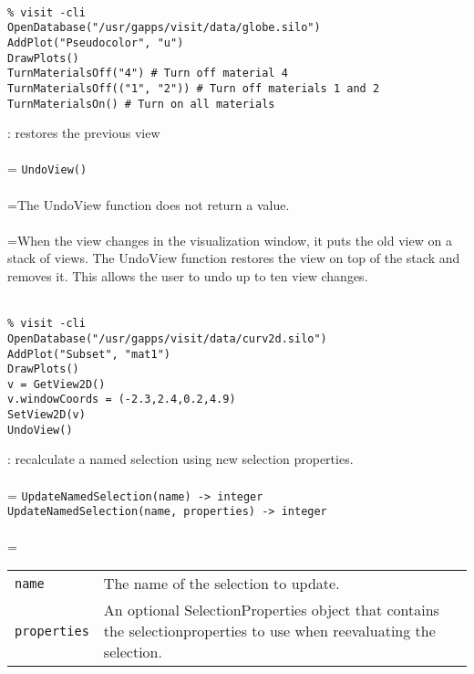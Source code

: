 \documentclass[10pt,a4paper]{report}
\begin{document}
\\[-6mm]
\begin{verbatim}% visit -cli
OpenDatabase("/usr/gapps/visit/data/globe.silo")
AddPlot("Pseudocolor", "u")
DrawPlots()
TurnMaterialsOff("4") # Turn off material 4
TurnMaterialsOff(("1", "2")) # Turn off materials 1 and 2
TurnMaterialsOn() # Turn on all materials
\end{verbatim}
\newpage


{}
: restores the previous view\\[-3mm]

 \\ 
\hangindent=\parindent 
\verb!UndoView()!\\ [-3mm]

 \\ 
\hangindent=\parindent The UndoView function does not return a value. \\[-3mm] 

 \\ 
\hangindent=\parindent When the view changes in the visualization window, it puts the old view on a stack of views. The UndoView function restores the view on top of the stack and removes it. This allows the user to undo up to ten view changes. \\[-3mm] 

\\[-6mm]
\begin{verbatim}% visit -cli
OpenDatabase("/usr/gapps/visit/data/curv2d.silo")
AddPlot("Subset", "mat1")
DrawPlots()
v = GetView2D()
v.windowCoords = (-2.3,2.4,0.2,4.9)
SetView2D(v)
UndoView()
\end{verbatim}
\newpage


{}
: recalculate a named selection using new selection properties.\\[-3mm]

 \\ 
\hangindent=\parindent 
\verb!UpdateNamedSelection(name) -> integer!\\ 
\verb!UpdateNamedSelection(name, properties) -> integer!\\ [-3mm]

 \\ 
\hangindent=\parindent 
\begin{tabular}{lp{9cm}}
\verb!name! & The name of the selection to update. \\
\verb!properties! & An optional SelectionProperties object that contains the selectionproperties to use when reevaluating the selection. \\
\end{tabular} \\[-2mm]
\end{document}
